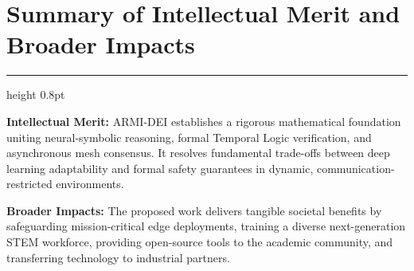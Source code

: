 \documentclass[11pt,letterpaper]{scrartcl}
\newcommand{\sectionline}{%
  \vspace{-0.5em}%
  {\color{NSFNavy}\hrule height 0.8pt}%
  \vspace{0.2em}%
}
\begin{document}
\section{Summary of Intellectual Merit and Broader Impacts}
\sectionline

\textbf{Intellectual Merit:} ARMI-DEI establishes a rigorous mathematical foundation uniting neural-symbolic reasoning, formal Temporal Logic verification, and asynchronous mesh consensus. It resolves fundamental trade-offs between deep learning adaptability and formal safety guarantees in dynamic, communication-restricted environments.

\textbf{Broader Impacts:} The proposed work delivers tangible societal benefits by safeguarding mission-critical edge deployments, training a diverse next-generation STEM workforce, providing open-source tools to the academic community, and transferring technology to industrial partners.
\end{document}
